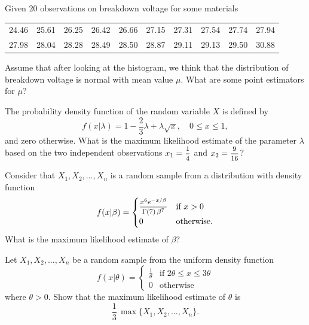 \begin{mdframed}
    \vspace{-0.25cm}
    \hspace{-0.25cm}
    \begin{Exercise}
        Given 20 observations on breakdown voltage for some materials
        \begin{center}
            \begin{tabular}{cccccccccc}
            24.46 & 25.61 & 26.25 & 26.42 & 26.66 & 27.15 & 27.31 & 27.54 & 27.74 & 27.94\\
            27.98 & 28.04 & 28.28 & 28.49 & 28.50 & 28.87 & 29.11 & 29.13 & 29.50 & 30.88\\
            \end{tabular}
        \end{center}

        Assume that after looking at the histogram, we think that 
the distribution of breakdown voltage is normal with 
mean value $\mu$.  What are some point estimators for $\mu$?
    \end{Exercise}

    \vspace{0.752cm}
    \begin{Exercise}
        The probability density function of the random variable $X$ is defined by 
        \[
            f(x|\lambda) = 1 - \frac{2}{3}\lambda + \lambda \sqrt{x}, \quad 0 \leq x \leq 1,
        \]
        and zero otherwise. What is the maximum likelihood estimate of the parameter $\lambda$ based on the 
        two independent observations $x_1 = \mfrac{1}{4}$ and $x_2 = \mfrac{9}{16}$?
    \end{Exercise}

    \vspace{0.752cm}
    \begin{Exercise}
        Consider that $X_1, X_2, \ldots, X_n$ is a random sample from a distribution with density 
        function
        \[
            f(x|\beta) = \begin{cases}
                \mfrac{x^6 e^{-x/\beta}}{\Gamma(7)\, \beta^7} & \text{if } x > 0\\
                0 & \text{otherwise}.
            \end{cases}
        \]
        What is the maximum likelihood estimate of $\beta$?
    \end{Exercise}

    \vspace{0.752cm}
    \begin{Exercise}
        Let $X_1, X_2, \ldots, X_n$ be a random sample from the uniform density 
        function
        \[
            f(x|\theta) = \begin{cases}
                \frac{1}{\theta} & \text{if } 2\theta \leq x \leq 3\theta\\
                0 & \text{otherwise}
            \end{cases}
        \]
        where $\theta > 0$. Show that the maximum likelihood estimate of $\theta$ is 
        \[
            \frac{1}{3}\, \max \{ X_1, X_2,\ldots ,X_n\}.
        \]
    \end{Exercise}


\end{mdframed}
